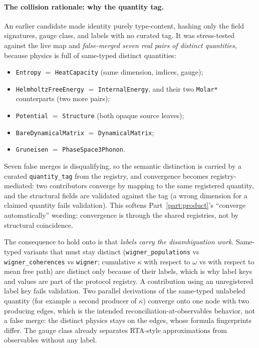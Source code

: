 \documentclass[11pt,a4paper]{article}
\begin{document}
\paragraph{The collision rationale: why the quantity tag.} An earlier candidate
made identity purely type-content, hashing only the field signatures, gauge
class, and labels with no curated tag. It was stress-tested against the live map
and \emph{false-merged seven real pairs of distinct quantities}, because physics
is full of same-typed distinct quantities:
\begin{itemize}[leftmargin=2em, itemsep=0.15em]
  \item \texttt{Entropy} $=$ \texttt{HeatCapacity} (same dimension, indices, gauge);
  \item \texttt{HelmholtzFreeEnergy} $=$ \texttt{InternalEnergy}, and their two
        \texttt{Molar*} counterparts (two more pairs);
  \item \texttt{Potential} $=$ \texttt{Structure} (both opaque source leaves);
  \item \texttt{BareDynamicalMatrix} $=$ \texttt{DynamicalMatrix};
  \item \texttt{Gruneisen} $=$ \texttt{PhaseSpace3Phonon}.
\end{itemize}
Seven false merges is disqualifying, so the semantic distinction is carried by a
curated \texttt{quantity\_tag} from the registry, and convergence becomes
registry-mediated: two contributors converge by mapping to the same registered
quantity, and the structural fields are validated against the tag (a wrong
dimension for a claimed quantity fails validation). This softens
Part~\ref{part:product}'s ``converge automatically'' wording: convergence is
through the shared registries, not by structural coincidence.

The consequence to hold onto is that \emph{labels carry the disambiguation work}.
Same-typed variants that must stay distinct
(\texttt{wigner\_populations} vs \texttt{wigner\_coherences} vs \texttt{wigner};
cumulative $\kappa$ with respect to $\omega$ vs with respect to mean free path)
are distinct only because of their labels, which is why label keys and values are
part of the protocol registry. A contribution using an unregistered label key
fails validation. Two parallel derivations of the same-typed unlabeled quantity
(for example a second producer of $\kappa$) converge onto one node with two
producing edges, which is the intended reconciliation-at-observables behavior, not
a false merge: the distinct physics stays on the edges, whose formula fingerprints
differ. The gauge class already separates RTA-style approximations from
observables without any label.
\end{document}
